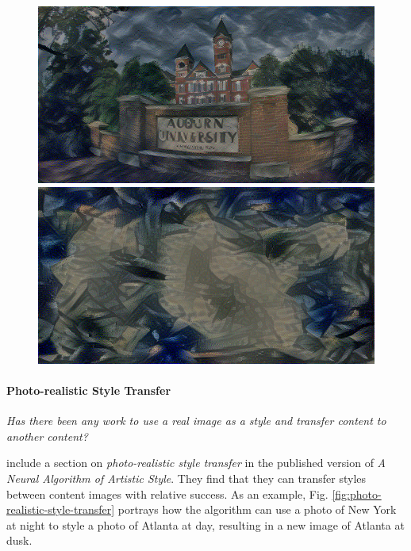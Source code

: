 \documentclass{article}
\begin{document}
\begin{figure}[htp]
\medskip

    \begin{minipage}{0.3\linewidth}
    \includegraphics[width=\textwidth]{img/content-layer-selection/block4_conv1}
    \end{minipage}
    \begin{minipage}{0.3\linewidth}
    \includegraphics[width=\textwidth]{img/content-layer-selection/block5_conv1}
    \end{minipage}

\end{figure}


\paragraph{Photo-realistic Style Transfer} \textit{Has there been any work to
use a real image as a style and transfer content to another content?}

\cite{gatys2016image} include a section on \textit{photo-realistic style
transfer} in the published version of \textit{A Neural Algorithm of Artistic
Style}. They find that they can transfer styles between content images with
relative success. As an example, Fig. \ref{fig:photo-realistic-style-transfer}
portrays how the algorithm can use a photo of New York at night to style a
photo of Atlanta at day, resulting in a new image of Atlanta at dusk.
\end{document}
